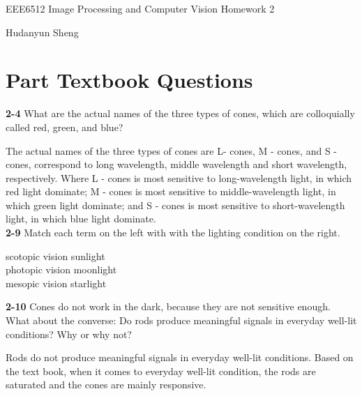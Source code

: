\documentclass[a4paper]{article}
\begin{document}
\begin{spacing}{2.0}
\begin{flushleft}\begin{huge}EEE6512 Image Processing and Computer Vision   Homework 2\end{huge}\end{flushleft}
\begin{flushright}\begin{Large} Hudanyun Sheng \end{Large}\end{flushright}

\section*{\huge\textbf{ Part \uppercase\expandafter{} Textbook Questions}  }
	\normalsize
	
	\textbf{2-4} What are the actual names of the three types of cones, which are colloquially called red, green, and blue?
	
	The actual names of the three types of cones are L- cones, M - cones, and S - cones, correspond to long wavelength, middle 
	wavelength and short wavelength, respectively. Where L - cones is most sensitive to long-wavelength light, in which red light dominate; M - cones is 
	most sensitive to middle-wavelength light, in which green light dominate; and S - cones is most sensitive to short-wavelength light, in which blue light 
	dominate.\\
	
	\noindent
	\textbf{2-9} Match each term on the left with with the lighting condition on the right.
	\begin{center}
	scotopic vision    \qquad  \qquad   \qquad   \qquad   \qquad    sunlight\\
	photopic vision    \qquad  \qquad   \qquad   \qquad   \qquad    moonlight\\
	mesopic vision    \qquad  \qquad   \qquad   \qquad   \qquad    starlight\\
	\end{center}
	
	\noindent
	\textbf{2-10} Cones do not work in the dark, because they are not sensitive enough. What about the converse: Do rods produce meaningful signals 
	in everyday well-lit conditions? Why or why not?
	
	Rods do not produce meaningful signals in everyday well-lit conditions. Based on the text book, when it comes to everyday well-lit condition, the rods are saturated and the cones are mainly responsive.\\
	

\end{spacing}
\end{document}
